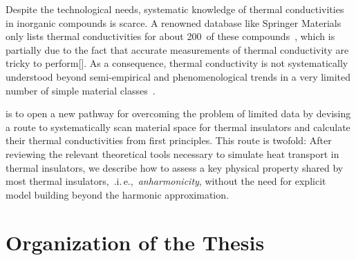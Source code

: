 
Despite the technological needs, systematic knowledge of thermal conductivities in inorganic compounds is scarce. A renowned database like Springer Materials only lists thermal conductivities for about 200~of these compounds~\cite{SpringerMaterials}, which is partially due to the fact that accurate measurements of thermal conductivity are tricky to perform[]. As a consequence, thermal conductivity is not systematically understood beyond semi-empirical and phenomenological trends in a very limited number of simple material classes~\cite{morelli2006}.

 is to open a new pathway for overcoming the problem of limited data by devising a route to systematically scan material space for thermal insulators and calculate their thermal conductivities from first principles. This route is twofold: After reviewing the relevant theoretical tools necessary to simulate heat transport in thermal insulators, we describe how to assess a key physical property shared by most thermal insulators,~.i.\,e.,~\emph{anharmonicity}, without the need for explicit model building beyond the harmonic approximation.

\section*{Organization of the Thesis}
